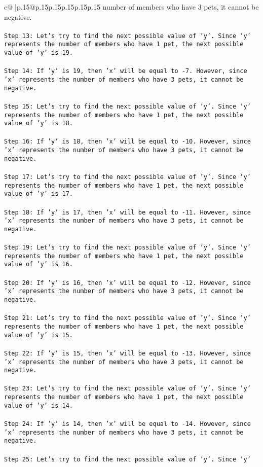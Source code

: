 \documentclass{article}
\begin{document}
{\begin{supertabular}{c@{$\;$}|p{.15\linewidth}@{}p{.15\linewidth}p{.15\linewidth}p{.15\linewidth}p{.15\linewidth}p{.15\linewidth}}
{{{number of members who have 3 pets, it cannot be negative.\\ \tt \\ \tt Step 13: Let's try to find the next possible value of 'y'. Since 'y' represents the number of members who have 1 pet, the next possible value of 'y' is 19.\\ \tt \\ \tt Step 14: If 'y' is 19, then 'x' will be equal to -7. However, since 'x' represents the number of members who have 3 pets, it cannot be negative.\\ \tt \\ \tt Step 15: Let's try to find the next possible value of 'y'. Since 'y' represents the number of members who have 1 pet, the next possible value of 'y' is 18.\\ \tt \\ \tt Step 16: If 'y' is 18, then 'x' will be equal to -10. However, since 'x' represents the number of members who have 3 pets, it cannot be negative.\\ \tt \\ \tt Step 17: Let's try to find the next possible value of 'y'. Since 'y' represents the number of members who have 1 pet, the next possible value of 'y' is 17.\\ \tt \\ \tt Step 18: If 'y' is 17, then 'x' will be equal to -11. However, since 'x' represents the number of members who have 3 pets, it cannot be negative.\\ \tt \\ \tt Step 19: Let's try to find the next possible value of 'y'. Since 'y' represents the number of members who have 1 pet, the next possible value of 'y' is 16.\\ \tt \\ \tt Step 20: If 'y' is 16, then 'x' will be equal to -12. However, since 'x' represents the number of members who have 3 pets, it cannot be negative.\\ \tt \\ \tt Step 21: Let's try to find the next possible value of 'y'. Since 'y' represents the number of members who have 1 pet, the next possible value of 'y' is 15.\\ \tt \\ \tt Step 22: If 'y' is 15, then 'x' will be equal to -13. However, since 'x' represents the number of members who have 3 pets, it cannot be negative.\\ \tt \\ \tt Step 23: Let's try to find the next possible value of 'y'. Since 'y' represents the number of members who have 1 pet, the next possible value of 'y' is 14.\\ \tt \\ \tt Step 24: If 'y' is 14, then 'x' will be equal to -14. However, since 'x' represents the number of members who have 3 pets, it cannot be negative.\\ \tt \\ \tt Step 25: Let's try to find the next possible value of 'y'. Since 'y' }}}
\end{supertabular}}
\end{document}
